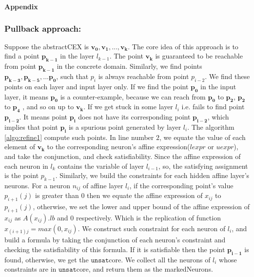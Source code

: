\onecolumn

\begin{center}
    \Large{\bf{Appendix}}    
\end{center}


\subsubsection{Pullback approach: }

Suppose the abstractCEX is $\boldsymbol{v_0}, \boldsymbol{v_1}, ... , \boldsymbol{v_k}$. 
The core idea of this approach is to find a point $\boldsymbol{p_{k-1}}$ in the layer $l_{k-1}$. 
The point $\boldsymbol{v_k}$ is guaranteed to be reachable from point $\boldsymbol{p_{k-1}}$ in the concrete domain.
Similarly, we find points $\boldsymbol{p_{k-3}}, \boldsymbol{p_{k-5}}, ... \boldsymbol{p_0}$, 
such that $p_i$ is always reachable from point $p_{i-2}$. 
We find these points on each \relu{} layer and input layer only. 
If we find the point $\boldsymbol{p_0}$ in the input layer, it means $\boldsymbol{p_0}$ is a counter-example, 
because we can reach from $\boldsymbol{p_0}$ to $\boldsymbol{p_2}$, $\boldsymbol{p_2}$ to $\boldsymbol{p_4}$ 
, and so on up to $\boldsymbol{v_k}$. 
If we get stuck in some layer $l_i$ i.e. fails to find point 
$\boldsymbol{p_{i-2}}$. It means point $\boldsymbol{p_i}$ does not have its corresponding point $\boldsymbol{p_{i-2}}$, 
which implies that point $\boldsymbol{p_i}$ is a spurious point generated by \relu{} layer $l_i$. 
The algorithm \ref{algo:refine1} compute such points. In line number $2$, we equate the value of 
each element of $\boldsymbol{v_k}$ to the corresponding neuron's affine expression($lexpr$ or $uexpr$), 
and take the conjunction, and check satisfiability. Since the affine expression of each neuron in $l_k$ contains the 
variable of layer $l_{i-1}$, so, the satisfying assignment is the point $p_{k-1}$. Similarly, we build the constraints
for each hidden affine layer's neurons. For a neuron $n_{ij}$ of affine layer $l_i$, 
if the corresponding point's value $p_{i+1}(j)$ is greater than $0$ then we equate the affine expression of $x_{ij}$ to $p_{i+1}(j)$,
otherwise, we set the lower and upper bound of the affine expression of $x_{ij}$ as $A(x_{ij}).lb$ and $0$ respectively. 
Which is the replication of \relu{} function $x_{(i+1)j} = max(0, x_{ij})$. We construct such constraint 
for each neuron of $l_i$, and build a formula by taking the conjunction
of each neuron’s constraint and checking the satisfiability of this formula.
If it is satisfiable then the point $\boldsymbol{p_{i-1}}$ is found, 
otherwise, we get the $\mathtt{unsat}$core. We collect all the neurons of $l_i$ whose constraints are 
in $\mathtt{unsat}$core, and return them as the markedNeurons.   



